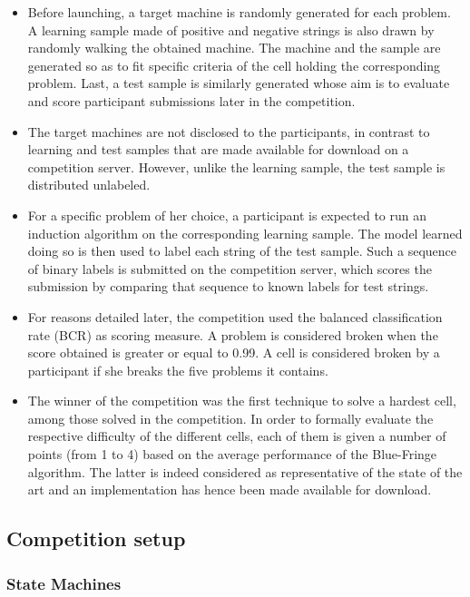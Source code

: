 \begin{itemize}
\item Before launching, a target machine is randomly generated for each problem. A learning sample made of positive and negative strings is also drawn by randomly walking the obtained machine. The machine and the sample are generated so as to fit specific criteria of the cell holding the corresponding problem. Last, a test sample is similarly generated whose aim is to evaluate and score participant submissions later in the competition.
\item The target machines are not disclosed to the participants, in contrast to learning and test samples that are made available for download on a competition server. However, unlike the learning sample, the test sample is distributed unlabeled. 
\item For a specific problem of her choice, a participant is expected to run an induction algorithm on the corresponding learning sample. The model learned doing so is then used to label each string of the test sample. Such a sequence of binary labels is submitted on the competition server, which scores the submission by comparing that sequence to known labels for test strings. 
\item For reasons detailed later, the competition used the balanced classification rate (BCR) as scoring measure. A problem is considered broken when the score obtained is greater or equal to 0.99. A cell is considered broken by a participant if she breaks the five problems it contains. 
\item The winner of the competition was the first technique to solve a hardest cell, among those solved in the competition. In order to formally evaluate the respective difficulty of the different cells, each of them is given a number of points (from 1 to 4) based on the average performance of the Blue-Fringe algorithm. The latter is indeed considered as representative of the state of the art and an implementation has hence been made available for download. 
\end{itemize}

\subsection{Competition setup\label{subsection_stamina_setup}}

\subsubsection*{State Machines}

